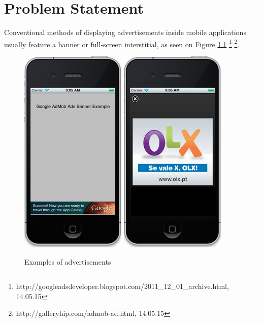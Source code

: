 
\chapter{Problem Statement} %


Conventional methods of displaying advertisements inside mobile applications usually feature a banner or full-screen interstitial, as seen on Figure \ref{fig:ads} \footnote[36]{http://googleadsdeveloper.blogspot.com/2011\_12\_01\_archive.html, 14.05.15} \footnote[37]{http://galleryhip.com/admob-ad.html, 14.05.15}.

\begin{figure}
\begin{center}
\includegraphics{Images/banner.png}
\includegraphics{Images/fullscreen.png}
\caption{Examples of advertisements}
\label{fig:ads}
\end{center}
\end{figure}

